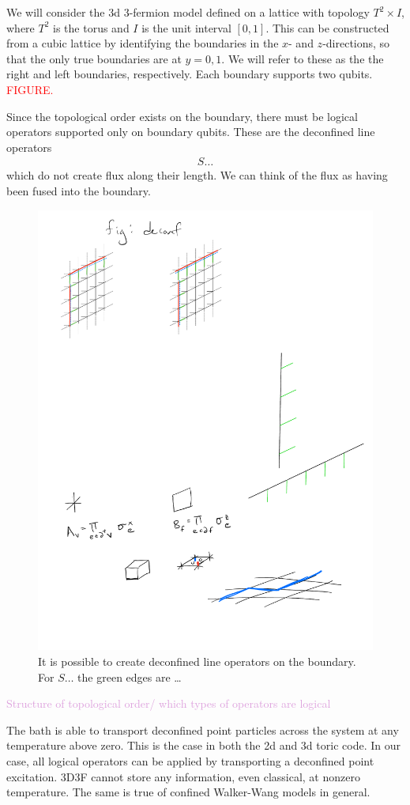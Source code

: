 \documentclass[twocolumn, longbibliography]{revtex4-2}
\newcommand{\note}[1]{\textcolor{red}{#1}}
\newcommand{\outline}[1]{\textcolor{Plum}{#1}}
\begin{document}
We will consider the 3d 3-fermion model defined on a lattice with topology $T^2\times I$, where $T^2$ is the torus and $I$ is the unit interval $[0,1]$. This can be constructed from a cubic lattice by identifying the boundaries in the $x$- and $z$-directions, so that the only true boundaries are at $y=0,1$. We will refer to these as the the right and left boundaries, respectively. Each boundary supports two qubits. \note{FIGURE.}
	
Since the topological order exists on the boundary, there must be logical operators supported only on boundary qubits. These are the deconfined line operators
\begin{align}
S\dots
\end{align}
which do not create flux along their length. We can think of the flux as having been fused into the boundary.

\begin{figure}
\centering
\includegraphics[width=.5\linewidth]{deconf}
\caption{It is possible to create deconfined line operators on the boundary. For $S\dots$ the green edges are \dots}
\label{fig:deconf}
\end{figure}
	
\outline{Structure of topological order/ which types of operators are logical}
	
The bath is able to transport deconfined point particles across the system at any temperature above zero. This is the case in both the 2d and 3d toric code. In our case, all logical operators can be applied by transporting a deconfined point excitation. 3D3F cannot store any information, even classical, at nonzero temperature. The same is true of confined Walker-Wang models in general. 
	
\end{document}
